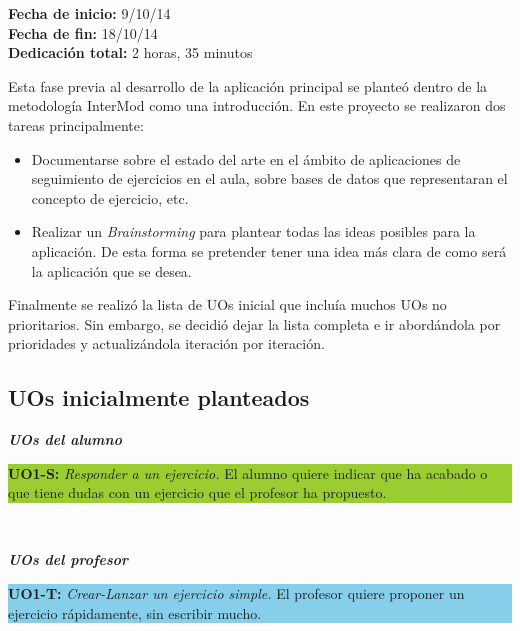 \begin{flushleft}
\textbf{Fecha de inicio:} 9/10/14\\
\textbf{Fecha de fin:} 18/10/14\\
\textbf{Dedicación total:} 2 horas, 35 minutos\\
\end{flushleft}

Esta fase previa al desarrollo de la aplicación principal se planteó dentro de la metodología InterMod como una introducción. En este proyecto se realizaron dos tareas principalmente:

\begin{itemize}
\item Documentarse sobre el estado del arte en el ámbito de aplicaciones de seguimiento de ejercicios en el aula, sobre bases de datos que representaran el concepto de ejercicio, etc.
\item Realizar un \textit{Brainstorming} para plantear todas las ideas posibles para la aplicación. De esta forma se pretender tener una idea más clara de como será la aplicación que se desea.
\end{itemize}

Finalmente se realizó la lista de UOs inicial que incluía muchos UOs no prioritarios. Sin embargo, se decidió dejar la lista completa e ir abordándola por prioridades y actualizándola iteración por iteración.\\

\subsection{UOs inicialmente planteados}
\label{step0:uos}

\textbf\textit{\large UOs del alumno}\\

\colorbox{YellowGreen}{\parbox[c]{1.0\textwidth}{
	\textbf{UO1-S:} \textit{Responder a un ejercicio.} El alumno quiere indicar que ha acabado o que tiene dudas con 			un ejercicio que el profesor ha propuesto.\\
}}\\

\vspace{0.3cm}

\textbf\textit{\large UOs del profesor}\\

\colorbox{SkyBlue}{\parbox[c]{1.0\textwidth}{
\textbf{UO1-T:} \textit{Crear-Lanzar un ejercicio simple.} El profesor quiere proponer un ejercicio rápidamente, sin escribir mucho.\\
}}\\

